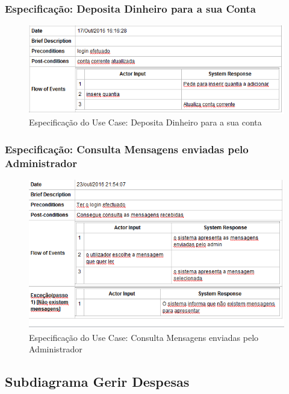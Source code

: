 \subsubsection{Especificação: Deposita Dinheiro para a sua Conta }
\begin{figure}[htb!]
	\centering
	\includegraphics[scale=0.6]{imagens/Especificacoes/depositadinheiro}  
	\caption{Especificação do Use Case: Deposita Dinheiro para a sua conta  }  
\end{figure}

\subsubsection{Especificação: Consulta Mensagens enviadas pelo Administrador }
\begin{figure}[htb!]
	\centering
	\includegraphics[scale=0.6]{imagens/Especificacoes/consultasmsadmin}  
	\caption{Especificação do Use Case: Consulta Mensagens enviadas pelo Administrador}  
\end{figure}

\newpage
\subsection{Subdiagrama Gerir Despesas}

